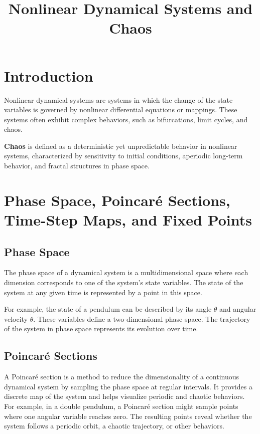\documentclass{article}
\title{Nonlinear Dynamical Systems and Chaos}
\author{}
\date{}
\begin{document}
\maketitle

\section{Introduction}

Nonlinear dynamical systems are systems in which the change of the state variables is governed by nonlinear differential equations or mappings. These systems often exhibit complex behaviors, such as bifurcations, limit cycles, and chaos.

\textbf{Chaos} is defined as a deterministic yet unpredictable behavior in nonlinear systems, characterized by sensitivity to initial conditions, aperiodic long-term behavior, and fractal structures in phase space.

\section{Phase Space, Poincar\'{e} Sections, Time-Step Maps, and Fixed Points}

\subsection{Phase Space}
The phase space of a dynamical system is a multidimensional space where each dimension corresponds to one of the system's state variables. The state of the system at any given time is represented by a point in this space. 

For example, the state of a pendulum can be described by its angle $\theta$ and angular velocity $\dot{\theta}$. These variables define a two-dimensional phase space. The trajectory of the system in phase space represents its evolution over time.

\subsection{Poincar\'{e} Sections}
A Poincar\'{e} section is a method to reduce the dimensionality of a continuous dynamical system by sampling the phase space at regular intervals. It provides a discrete map of the system and helps visualize periodic and chaotic behaviors. For example, in a double pendulum, a Poincar\'{e} section might sample points where one angular variable reaches zero. The resulting points reveal whether the system follows a periodic orbit, a chaotic trajectory, or other behaviors.
\end{document}
